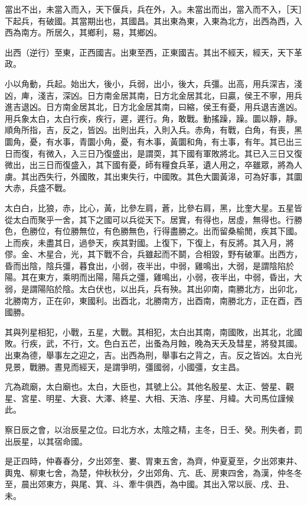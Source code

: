 當出不出，未當入而入，天下偃兵，兵在外，入。未當出而出，當入而不入，［天］下起兵，有破國。其當期出也，其國昌。其出東為東，入東為北方，出西為西，入西為南方。所居久，其鄉利，易，其鄉凶。

出西（逆行）至東，正西國吉。出東至西，正東國吉。其出不經天，經天，天下革政。

小以角動，兵起。始出大，後小，兵弱，出小，後大，兵彊。出高，用兵深吉，淺凶，庳，淺吉，深凶。日方南金居其南，日方北金居其北，曰贏，侯王不寧，用兵進吉退凶。日方南金居其北，日方北金居其南，曰縮，侯王有憂，用兵退吉進凶。用兵象太白，太白行疾，疾行，遲，遲行。角，敢戰。動搖躁，躁。圜以靜，靜。順角所指，吉，反之，皆凶。出則出兵，入則入兵。赤角，有戰，白角，有喪，黑圜角，憂，有水事，青圜小角，憂，有木事，黃圜和角，有土事，有年。其已出三日而復，有微入，入三日乃復盛出，是謂耎，其下國有軍敗將北。其已入三日又復微出，出三日而復盛入，其下國有憂，師有糧食兵革，遺人用之，卒雖眾，將為人虜。其出西失行，外國敗，其出東失行，中國敗。其色大圜黃滜，可為好事，其圜大赤，兵盛不戰。

太白白，比狼，赤，比心，黃，比參左肩，蒼，比參右肩，黑，比奎大星。五星皆從太白而聚乎一舍，其下之國可以兵從天下。居實，有得也，居虛，無得也。行勝色，色勝位，有位勝無位，有色勝無色，行得盡勝之。出而留桑榆閒，疾其下國。上而疾，未盡其日，過參天，疾其對國。上復下，下復上，有反將。其入月，將僇。金、木星合，光，其下戰不合，兵雖起而不鬬，合相毀，野有破軍。出西方，昏而出陰，陰兵彊，暮食出，小弱，夜半出，中弱，雞鳴出，大弱，是謂陰陷於陽。其在東方，乘明而出陽，陽兵之彊，雞鳴出，小弱，夜半出，中弱，昏出，大弱，是謂陽陷於陰。太白伏也，以出兵，兵有殃。其出卯南，南勝北方，出卯北，北勝南方，正在卯，東國利。出酉北，北勝南方，出酉南，南勝北方，正在酉，西國勝。

其與列星相犯，小戰，五星，大戰。其相犯，太白出其南，南國敗，出其北，北國敗。行疾，武，不行，文。色白五芒，出蚤為月蝕，晚為天夭及彗星，將發其國。出東為德，舉事左之迎之，吉。出西為刑，舉事右之背之，吉。反之皆凶。太白光見景，戰勝。晝見而經天，是謂爭明，彊國弱，小國彊，女主昌。

亢為疏廟，太白廟也。太白，大臣也，其號上公。其他名殷星、太正、營星、觀星、宮星、明星、大衰、大澤、終星、大相、天浩、序星、月緯。大司馬位謹候此。

察日辰之會，以治辰星之位。曰北方水，太陰之精，主冬，日壬、癸。刑失者，罰出辰星，以其宿命國。

是正四時，仲春春分，夕出郊奎、婁、胃東五舍，為齊，仲夏夏至，夕出郊東井、輿鬼、柳東七舍，為楚，仲秋秋分，夕出郊角、亢、氐、房東四舍，為漢，仲冬冬至，晨出郊東方，與尾、箕、斗、牽牛俱西，為中國。其出入常以辰、戌、丑、未。

